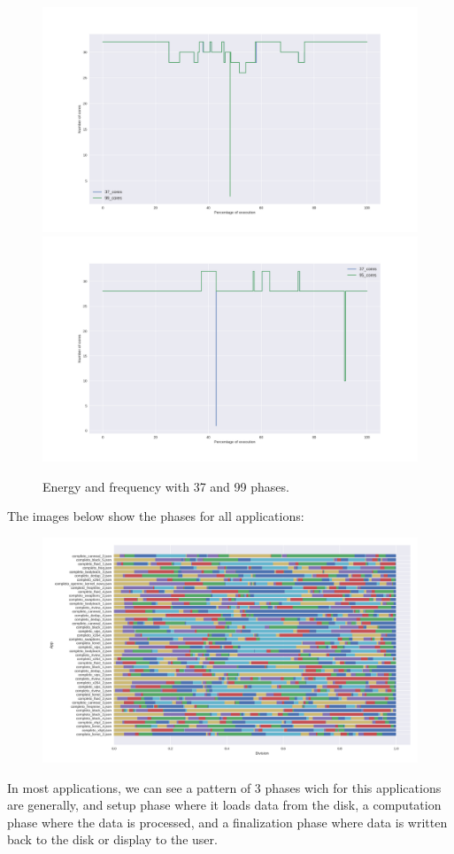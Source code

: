 \begin{figure}[h!]
\includegraphics[width=\columnwidth]{phases/figures/signals/completo_black_3_freq_signals_cmp.png}
\includegraphics[width=\columnwidth]{phases/figures/signals/completo_bodytrack_3_freq_signals_cmp.png}
\caption{Energy and frequency with 37 and 99 phases.}
    \label{fig:freq_control}
\end{figure}

The images below show the phases for all applications:
\begin{figure}[H]
\includegraphics[width=\columnwidth]{phases/figures/phase_division_35.png}
\end{figure}
In most applications, we can see a pattern of 3 phases wich for this applications are generally, and setup phase where it loads data from the disk, a computation phase where the data is processed, and a finalization phase where data is written back to the disk or display to the user.

